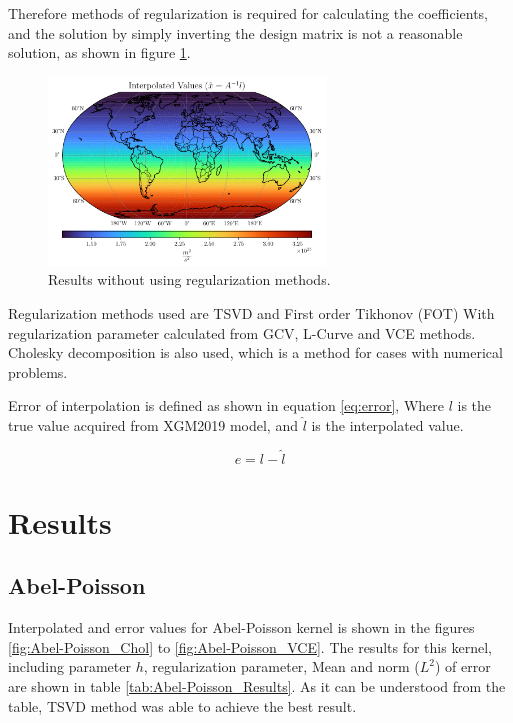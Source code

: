 \documentclass[12pt]{article}
\begin{document}
	Therefore methods of regularization is required for calculating the coefficients, and the solution by simply inverting the design matrix is not a reasonable solution, as shown in figure \ref{fig:NoRegResult}.  
	
	\begin{figure}[h!]
		\centering
		\includegraphics[height=5cm]{../Outputs/Plots/NoRegResult.pdf}
		\caption{Results without using regularization methods.}
		\label{fig:NoRegResult}
	\end{figure}
	
	Regularization methods used are TSVD and First order Tikhonov (FOT) With regularization parameter calculated from GCV, L-Curve and VCE methods. Cholesky decomposition is also used, which is a method for cases with numerical problems.
	

	
	Error of interpolation is defined as shown in equation \ref{eq:error}, Where $l$ is the true value acquired from XGM2019 model, and $\hat{l}$ is the interpolated value.
	
	\begin{equation}
		e = l - \hat{l}
		\label{eq:error}
	\end{equation}


	\section{Results}

	\subsection{Abel-Poisson}
	
	Interpolated and error values for Abel-Poisson kernel is shown in the figures \ref{fig:Abel-Poisson_Chol} to \ref{fig:Abel-Poisson_VCE}. The results for this kernel, including parameter $h$, regularization parameter, Mean and norm ($L^2$) of error are shown in table \ref{tab:Abel-Poisson_Results}. As it can be understood from the table, TSVD method was able to achieve the best result.
	
\end{document}
